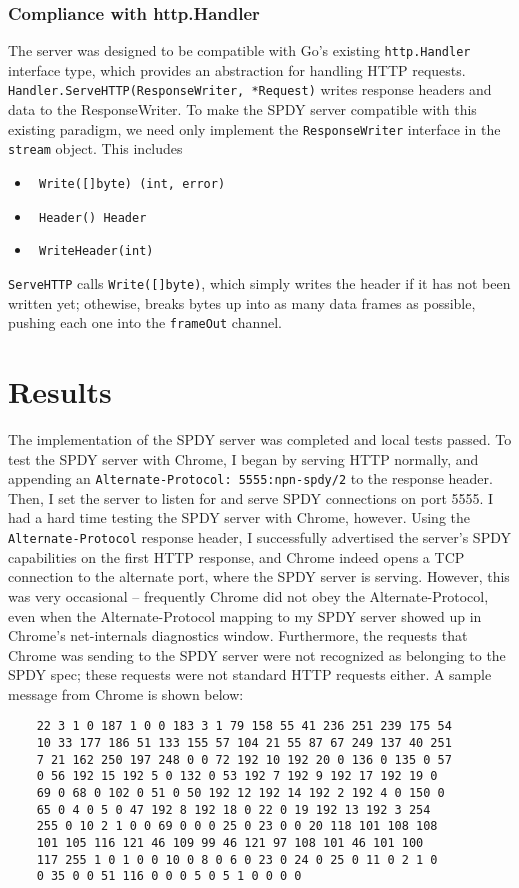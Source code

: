 \documentclass{article}
\begin{document}
\subsubsection{Compliance with http.Handler}
The server was designed to be compatible with Go's existing \verb|http.Handler| interface type, which provides an abstraction for handling
HTTP requests. \verb|Handler.ServeHTTP(ResponseWriter, *Request)| writes response headers and data to the ResponseWriter. To make the SPDY server
compatible with this existing paradigm, we need only implement the \verb|ResponseWriter| interface in the \verb|stream| object. This includes
\begin{itemize}
  \item \verb| Write([]byte) (int, error)| 
  \item \verb| Header() Header | 
  \item \verb| WriteHeader(int)|  
\end{itemize}
\verb|ServeHTTP| calls \verb|Write([]byte)|, which simply writes the header if it has not been written yet; othewise, breaks bytes up into as many data frames as possible, pushing each one into the \verb|frameOut| channel.

\section{Results}
  The implementation of the SPDY server was completed and local tests passed. To test the SPDY server with Chrome, I began by serving HTTP normally, and appending an \verb|Alternate-Protocol: 5555:npn-spdy/2| to the response header. Then, I set the server to listen for and serve SPDY connections on port 5555.
  I had a hard time testing the SPDY server with Chrome, however. Using the \verb|Alternate-Protocol| response header, I successfully advertised the server's SPDY capabilities on the first HTTP response, and Chrome indeed opens a TCP connection to the alternate port, where the SPDY server is serving. However, this was very occasional -- frequently Chrome did not obey the Alternate-Protocol, even when the Alternate-Protocol mapping to my SPDY server showed up in Chrome's net-internals diagnostics window. Furthermore, the requests that Chrome was sending to the SPDY server were not recognized as belonging to the SPDY spec; these requests were not standard HTTP requests either. A sample message from Chrome is shown below:

    \begin{verbatim}
    22 3 1 0 187 1 0 0 183 3 1 79 158 55 41 236 251 239 175 54
    10 33 177 186 51 133 155 57 104 21 55 87 67 249 137 40 251
    7 21 162 250 197 248 0 0 72 192 10 192 20 0 136 0 135 0 57
    0 56 192 15 192 5 0 132 0 53 192 7 192 9 192 17 192 19 0 
    69 0 68 0 102 0 51 0 50 192 12 192 14 192 2 192 4 0 150 0
    65 0 4 0 5 0 47 192 8 192 18 0 22 0 19 192 13 192 3 254 
    255 0 10 2 1 0 0 69 0 0 0 25 0 23 0 0 20 118 101 108 108
    101 105 116 121 46 109 99 46 121 97 108 101 46 101 100
    117 255 1 0 1 0 0 10 0 8 0 6 0 23 0 24 0 25 0 11 0 2 1 0
    0 35 0 0 51 116 0 0 0 5 0 5 1 0 0 0 0 
  \end{verbatim}
\end{document}
